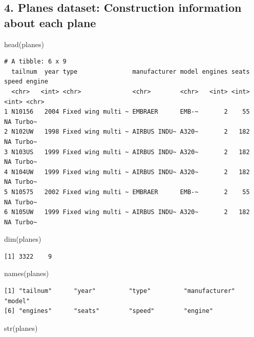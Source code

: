 \documentclass[
  10pt,
  letterpaper,
  DIV=11,
  numbers=noendperiod]{scrartcl}
\newenvironment{Shaded}{\begin{snugshade}}{\end{snugshade}}
\newcommand{\FunctionTok}[1]{\textcolor[rgb]{0.28,0.35,0.67}{#1}}
\newcommand{\NormalTok}[1]{\textcolor[rgb]{0.00,0.23,0.31}{#1}}
\begin{document}
\subsection{4. Planes dataset: Construction information about each
plane}\label{planes-dataset-construction-information-about-each-plane}

\begin{Shaded}
\begin{Highlighting}[numbers=left,,]
\FunctionTok{head}\NormalTok{(planes)}
\end{Highlighting}
\end{Shaded}

\begin{verbatim}
# A tibble: 6 x 9
  tailnum  year type               manufacturer model engines seats speed engine
  <chr>   <int> <chr>              <chr>        <chr>   <int> <int> <int> <chr> 
1 N10156   2004 Fixed wing multi ~ EMBRAER      EMB-~       2    55    NA Turbo~
2 N102UW   1998 Fixed wing multi ~ AIRBUS INDU~ A320~       2   182    NA Turbo~
3 N103US   1999 Fixed wing multi ~ AIRBUS INDU~ A320~       2   182    NA Turbo~
4 N104UW   1999 Fixed wing multi ~ AIRBUS INDU~ A320~       2   182    NA Turbo~
5 N10575   2002 Fixed wing multi ~ EMBRAER      EMB-~       2    55    NA Turbo~
6 N105UW   1999 Fixed wing multi ~ AIRBUS INDU~ A320~       2   182    NA Turbo~
\end{verbatim}

\begin{Shaded}
\begin{Highlighting}[numbers=left,,]
\FunctionTok{dim}\NormalTok{(planes)}
\end{Highlighting}
\end{Shaded}

\begin{verbatim}
[1] 3322    9
\end{verbatim}

\begin{Shaded}
\begin{Highlighting}[numbers=left,,]
\FunctionTok{names}\NormalTok{(planes)}
\end{Highlighting}
\end{Shaded}

\begin{verbatim}
[1] "tailnum"      "year"         "type"         "manufacturer" "model"       
[6] "engines"      "seats"        "speed"        "engine"      
\end{verbatim}

\begin{Shaded}
\begin{Highlighting}[numbers=left,,]
\FunctionTok{str}\NormalTok{(planes)}
\end{Highlighting}
\end{Shaded}
\end{document}
